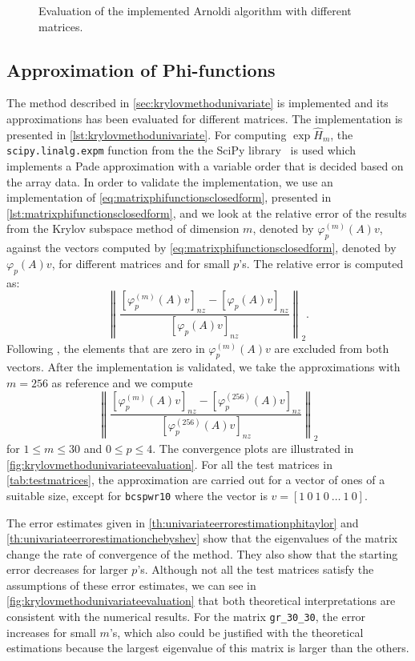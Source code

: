 \begin{figure}[h!]
    \caption{Evaluation of the implemented Arnoldi algorithm with different matrices.}
    \label{fig:krylovmethodunivariateevaluation}
\end{figure}


\subsection{Approximation of Phi-functions}
The method described in \autoref{sec:krylovmethodunivariate} is implemented and its approximations has been evaluated
for different matrices. The implementation is presented in \autoref{lst:krylovmethodunivariate}.
For computing $\exp{\hat{H}_m}$, the \texttt{scipy.linalg.expm} function from the the SciPy library~\cite{SciPy2020}
is used which implements a Pade approximation with a variable order that is decided based on the array data.
In order to validate the implementation, we use an implementation of \autoref{eq:matrixphifunctionsclosedform}, presented in
\autoref{lst:matrixphifunctionsclosedform}, and we look at the relative error of the results from the Krylov subspace
method of dimension $m$, denoted by $\varphi_p^{(m)}(A)v$, against the vectors computed by \autoref{eq:matrixphifunctionsclosedform},
denoted by $\varphi_p(A)v$, for different matrices and for small $p$'s. The relative error is computed as:
\begin{equation*}
    \left\| \frac{[\varphi_p^{(m)}(A)v]_{nz} - [\varphi_p(A)v]_{nz}}{[\varphi_p(A)v]_{nz}} \right\|_2.
\end{equation*}
Following \cite{niesen2012}, the elements that are zero in $\varphi_p^{(m)}(A)v$ are excluded from both vectors.
After the implementation is validated, we take the approximations with $m=256$ as reference and we compute
\begin{equation*}
    \left\| \frac{[\varphi_p^{(m)}(A)v]_{nz} - [\varphi_p^{(256)}(A)v]_{nz}}{[\varphi_p^{(256)}(A)v]_{nz}} \right\|_2
\end{equation*}
for $1 \le m \le 30$ and $0 \le p \le 4$. The convergence plots are illustrated in \autoref{fig:krylovmethodunivariateevaluation}.
For all the test matrices in \autoref{tab:testmatrices}, the approximation are carried out for a vector of ones of a suitable
size, except for \texttt{bcspwr10} where the vector is $v=[1\:0\:1\:0\:\dots\:1\:0]$.

The error estimates given in \autoref{th:univariateerrorestimationphitaylor} and \autoref{th:univariateerrorestimationchebyshev}
show that the eigenvalues of the matrix change the rate of convergence of the method. They also show that the starting error
decreases for larger $p$'s. Although not all the test matrices satisfy the assumptions of these error estimates, we can see in
\autoref{fig:krylovmethodunivariateevaluation} that both theoretical interpretations are consistent with the numerical results.
For the matrix \texttt{gr\_30\_30}, the error increases for small $m$'s, which also could be justified with the theoretical
estimations because the largest eigenvalue of this matrix is larger than the others.

